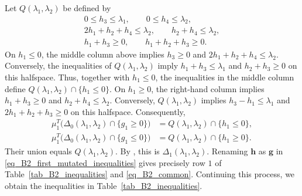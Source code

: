 \documentclass[10pt]{amsart}
\numberwithin{equation}{section}
\theoremstyle{plain}
\theoremstyle{definition}
\theoremstyle{remark}
\begin{document}
Let $Q(\lambda_1, \lambda_2)$ be defined by
\begin{equation}\label{eq_B2_first_mutated_inequalities}
	\begin{gathered}
		0\leq h_3\leq \lambda_1,\qquad 0\leq h_4\leq \lambda_2,\\
		2h_1+h_2+h_4\leq \lambda_2,\qquad h_2+h_4\leq \lambda_2,\\
		h_1+h_3\geq0,\qquad h_1+h_2+h_3\geq0.
	\end{gathered}
\end{equation}
On $h_1\leq0$, the middle column above implies $h_3\geq0$
and $2h_1+h_2+h_4\leq \lambda_2$. Conversely, the inequalities of $Q(\lambda_1, \lambda_2)$
imply $h_1+h_3\leq \lambda_1$ and $h_2+h_3\geq0$ on this halfspace.
Thus, together with $h_1\leq0$, the inequalities in the
middle column define
$Q(\lambda_1,\lambda_2)\cap\{h_1\leq0\}$.
On $h_1\geq0$, the right-hand column implies
$h_1+h_3\geq0$ and $h_2+h_4\leq \lambda_2$.
Conversely, $Q(\lambda_1, \lambda_2)$ implies $h_3-h_1\leq \lambda_1$ and
$2h_1+h_2+h_3\geq0$ on this halfspace.
Consequently,
\begin{align*}
	\mu_1^T\bigl(\Delta_0(\lambda_1, \lambda_2)\cap\{g_1\geq0\}\bigr)
	&=Q(\lambda_1, \lambda_2)\cap\{h_1\leq0\},\\
	\mu_1^T\bigl(\Delta_0(\lambda_1, \lambda_2)\cap\{g_1\leq0\}\bigr)
	&=Q(\lambda_1, \lambda_2)\cap\{h_1\geq0\}.
\end{align*}
Their union equals $Q(\lambda_1, \lambda_2)$.
By \cite[Corollary~5.7(2)]{FujitaOya}, this is
$\Delta_1(\lambda_1,\lambda_2)$. Renaming $\mathbf h$ as $\mathbf g$ in
\eqref{eq_B2_first_mutated_inequalities} gives precisely row $1$
of Table~\ref{tab_B2_inequalities} and \eqref{eq_B2_common}. 
Continuing this process, we obtain the inequalities in Table~\ref{tab_B2_inequalities}.
\end{document}
